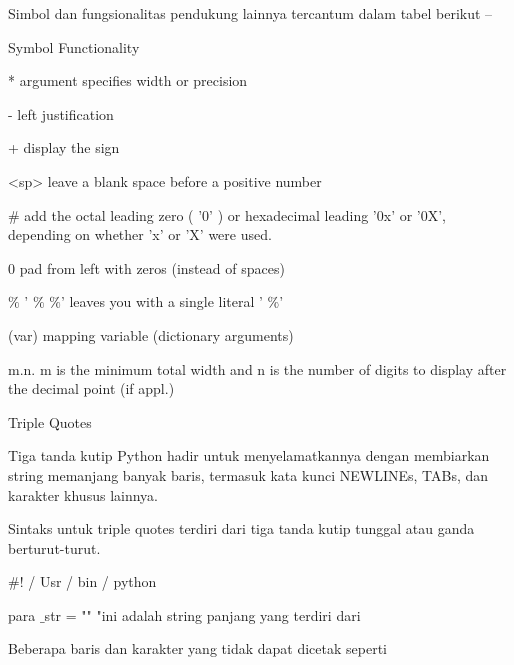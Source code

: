 Simbol dan fungsionalitas pendukung lainnya tercantum dalam tabel berikut – \par
\vspace{12pt}
Symbol \hspace*{0.5in} Functionality \par
* \hspace*{0.5in} argument specifies width or precision \par
- \hspace*{0.5in} left justification \par
+ \hspace*{0.5in} display the sign \par
<sp> \hspace*{0.5in} leave a blank space before a positive number \par
 $  \#  $ \hspace*{0.5in} add the octal leading zero ( '0' ) or hexadecimal leading '0x' or '0X', depending on whether 'x' or 'X' were used. \par
0 \hspace*{0.5in} pad from left with zeros (instead of spaces) \par
 $  \%  $ \hspace*{0.5in} ' $  \%  $ $  \%  $' leaves you with a single literal ' $  \%  $' \par
(var) \hspace*{0.5in} mapping variable (dictionary arguments) \par
m.n. \hspace*{0.5in} m is the minimum total width and n is the number of digits to display after the decimal point (if appl.) \par
\vspace{12pt}
Triple Quotes \par
\vspace{12pt}
Tiga tanda kutip Python hadir untuk menyelamatkannya dengan membiarkan string memanjang banyak baris, termasuk kata kunci NEWLINEs, TABs, dan karakter khusus lainnya. \par
Sintaks untuk triple quotes terdiri dari tiga tanda kutip tunggal atau ganda berturut-turut. \par
 $  \#  $! / Usr / bin / python \par
\vspace{12pt}
para $  \_  $str = "" "ini adalah string panjang yang terdiri dari \par
Beberapa baris dan karakter yang tidak dapat dicetak seperti \par
